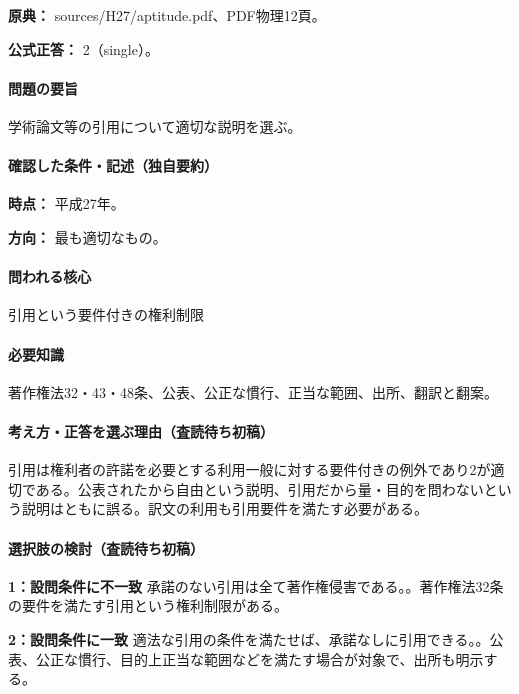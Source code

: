 \noindent\textbf{原典：} sources/H27/aptitude.pdf、PDF物理12頁。

\textbf{公式正答：} 2（single）。

\paragraph{問題の要旨} 学術論文等の引用について適切な説明を選ぶ。

\paragraph{確認した条件・記述（独自要約）}\mbox{}\par

\noindent\textbf{時点：} 平成27年。\par

\noindent\textbf{方向：} 最も適切なもの。\par

\paragraph{問われる核心} 引用という要件付きの権利制限

\paragraph{必要知識} 著作権法32・43・48条、公表、公正な慣行、正当な範囲、出所、翻訳と翻案。

\paragraph{考え方・正答を選ぶ理由（査読待ち初稿）} 引用は権利者の許諾を必要とする利用一般に対する要件付きの例外であり2が適切である。公表されたから自由という説明、引用だから量・目的を問わないという説明はともに誤る。訳文の利用も引用要件を満たす必要がある。

\paragraph{選択肢の検討（査読待ち初稿）}\mbox{}\par

\noindent\textbf{1：設問条件に不一致} 承諾のない引用は全て著作権侵害である。。著作権法32条の要件を満たす引用という権利制限がある。\par

\noindent\textbf{2：設問条件に一致} 適法な引用の条件を満たせば、承諾なしに引用できる。。公表、公正な慣行、目的上正当な範囲などを満たす場合が対象で、出所も明示する。\par

